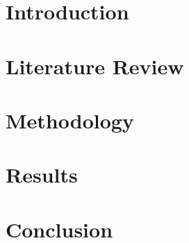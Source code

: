 \documentclass[a4paper, 30pt]{article}
\begin{document}
  \newpage
  \tableofcontents

  \newpage
  \section{Introduction}
  
  \section{Literature Review}
  
  \section{Methodology}
  
  \section{Results}
  
  \section{Conclusion}
  

  \newpage
  
  
\end{document}
